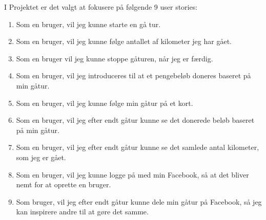 I Projektet er det valgt at fokusere på følgende 9 user stories:
\begin{enumerate}

\item Som en bruger, vil jeg kunne starte en gå tur.
\item Som en bruger, vil jeg kunne følge antallet af kilometer jeg har gået. 
\item Som en bruger vil jeg kunne stoppe gåturen, når jeg er færdig. 
\item Som en bruger, vil jeg introduceres til at et pengebeløb doneres baseret på min gåtur. 
\item Som en bruger, vil jeg kunne følge min gåtur på et kort. 
\item Som en bruger, vil jeg efter endt gåtur kunne se det donerede beløb baseret på min gåtur. 
\item Som en bruger, vil jeg efter endt gåtur kunne se det samlede antal kilometer, som jeg er gået. 
\item Som en bruger, vil jeg kunne logge på med min Facebook, så at det bliver nemt for at oprette en bruger. 
\item Som bruger, vil jeg efter endt gåtur kunne dele min gåtur på Facebook, så jeg kan inspirere andre til at gøre det samme. 
\end{enumerate}